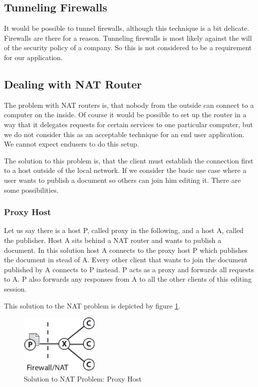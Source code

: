 \documentclass[11pt,a4paper]{article}
\begin{document}
\subsection{Tunneling Firewalls}
It would be possible to tunnel firewalls, although this technique is a bit delicate. Firewalls are there for a reason. Tunneling firewalls is most likely against the will of the security policy of a company. So this is not considered to be a requirement for our application.

\subsection{Dealing with NAT Router}
The problem with NAT routers is, that nobody from the outside can connect to a computer on the inside. Of course it would be possible to set up the router in a way that it delegates requests for certain services to one particular computer, but we do not consider this as an acceptable technique for an end user application. We cannot expect endusers to do this setup.

The solution to this problem is, that the client must establish the connection first to a host outside of the local network. If we consider the basic use case where a user wants to publish a document so others can join him editing it. There are some possibilities.

\subsubsection{Proxy Host}
Let us say there is a host P, called proxy in the following, and a host A, called the publisher. Host A sits behind a NAT router and wants to publish a document. In this solution host A connects to the proxy host P which publishes the document in stead of A. Every other client that wants to join the document published by A connects to P instead. P acts as a proxy and forwards all requests to A. P also forwards any responses from A to all the other clients of this editing session.

This solution to the NAT problem is depicted by figure \ref{fig:proxy}.

\begin{figure}[H]
 \centering
 \includegraphics[width=3.8cm,height=2.9cm]{../../images/net_proxy.eps}
 \caption{Solution to NAT Problem: Proxy Host}
 \label{fig:proxy}
\end{figure}
\end{document}
